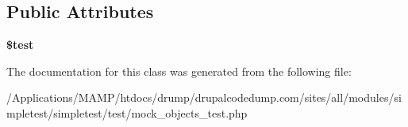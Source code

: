 \subsection*{Public Attributes}
\begin{DoxyCompactItemize}
\item 
\hypertarget{class_test_of_mock_expectations_a9989a6cead02c30a66e2a07199e26560}{
{\bfseries \$test}}
\label{class_test_of_mock_expectations_a9989a6cead02c30a66e2a07199e26560}

\end{DoxyCompactItemize}


The documentation for this class was generated from the following file:\begin{DoxyCompactItemize}
\item 
/Applications/MAMP/htdocs/drump/drupalcodedump.com/sites/all/modules/simpletest/simpletest/test/mock\_\-objects\_\-test.php\end{DoxyCompactItemize}
